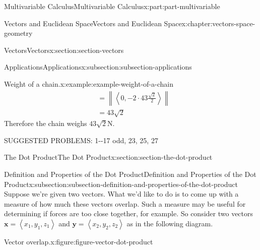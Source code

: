 \documentclass[twoside,10pt,]{tufte-book}
\numberwithin{equation}{part}
\newcommand{\norm}[1]{\left\| #1 \right\|}
\newcommand{\dotprod}[1]{\left\langle #1 \right\rangle}
\begin{document}
\begin{partptx}{Multivariable Calculus}{}{Multivariable Calculus}{}{}{x:part:part-multivariable}
\begin{chapterptx}{Vectors and Euclidean Space}{}{Vectors and Euclidean Space}{}{}{x:chapter:vectors-space-geometry}
\begin{sectionptx}{Vectors}{}{Vectors}{}{}{x:section:section-vectors}
\begin{subsectionptx}{Applications}{}{Applications}{}{}{x:subsection:subsection-applications}
\begin{example}{Weight of a chain.}{x:example:example-weight-of-a-chain}
\begin{align*}
& = \norm{\dotprod{0,-2\cdot43\frac{\sqrt{2}}{2}}}\\
& = 43\sqrt{2} 
\end{align*}
Therefore the chain weighs \(43\sqrt{2}\)\si{\newton}.%
\end{example}
%
SUGGESTED PROBLEMS: 1-{}-{}17 odd, 23, 25, 27%
\end{subsectionptx}
\end{sectionptx}
%
%
\typeout{************************************************}
\typeout{************************************************}
%
\begin{sectionptx}{The Dot Product}{}{The Dot Product}{}{}{x:section:section-the-dot-product}
%
%
\typeout{************************************************}
\typeout{************************************************}
%
\begin{subsectionptx}{Definition and Properties of the Dot Product}{}{Definition and Properties of the Dot Product}{}{}{x:subsection:subsection-definition-and-properties-of-the-dot-product}
Suppose we're given two vectors. What we'd like to do is to come up with a measure of how much these vectors overlap. Such a measure may be useful for determining if forces are too close together, for example. So consider two vectors \(\mathbf{x} = \dotprod{x_{1},y_{1},z_{1}}\) and \(\mathbf{y} = \dotprod{x_{2},y_{2},z_{2}}\) as in the following diagram.%
\begin{figureptx}{Vector overlap.}{x:figure:figure-vector-dot-product}{}%
\begin{image}{0.3}{0.4}{0.3}%
\end{image}
\end{figureptx}
\end{subsectionptx}
\end{sectionptx}
\end{chapterptx}
\end{partptx}
\end{document}
